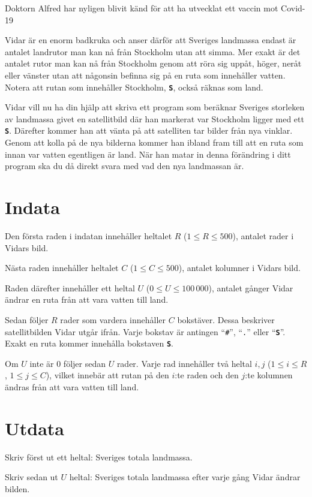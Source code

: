 Doktorn Alfred har nyligen blivit känd för att ha utvecklat ett vaccin mot Covid-19

Vidar är en enorm badkruka och anser därför att Sveriges landmassa endast är antalet landrutor man kan nå från Stockholm utan att simma.
Mer exakt är det antalet rutor man kan nå från Stockholm genom att röra sig uppåt, höger, neråt eller vänster utan att någonsin befinna sig på en ruta som innehåller vatten.
Notera att rutan som innehåller Stockholm, \textbf{\texttt{S}}, också räknas som land.

Vidar vill nu ha din hjälp att skriva ett program som beräknar Sveriges storleken av landmassa givet en satellitbild där han markerat var Stockholm ligger med ett \textbf{\texttt{S}}.
Därefter kommer han att vänta på att satelliten tar bilder från nya vinklar. Genom att kolla på de nya bilderna kommer han ibland fram till att en ruta som
innan var vatten egentligen är land. När han matar in denna förändring i ditt program ska du då direkt svara med vad den nya landmassan är.


\section*{Indata}
Den första raden i indatan innehåller heltalet $R$ ($1 \le R \le 500$), antalet rader i Vidars bild.

Nästa raden innehåller heltalet $C$ ($1 \le C \le 500$), antalet kolumner i Vidars bild.

Raden därefter innehåller ett heltal $U$ ($0 \le U \le 100\,000$), antalet gånger Vidar ändrar en ruta från att vara vatten till land.

Sedan följer $R$ rader som vardera innehåller $C$ bokstäver. Dessa beskriver satellitbilden Vidar utgår ifrån. Varje bokstav är antingen
``\texttt{\#}'', ``\texttt{.}'' eller ``\textbf{\texttt{S}}''. Exakt en ruta kommer innehålla bokstaven \textbf{\texttt{S}}.

Om $U$ inte är $0$ följer sedan $U$ rader. Varje rad innehåller två heltal $i,j$ ($1 \le i \le R$, $1 \le j \le C$), vilket innebär att rutan
på den $i$:te raden och den $j$:te kolumnen ändras från att vara vatten till land. 

\section*{Utdata}
Skriv först ut ett heltal: Sveriges totala landmassa.

Skriv sedan ut $U$ heltal: Sveriges totala landmassa efter varje gång Vidar ändrar bilden.

